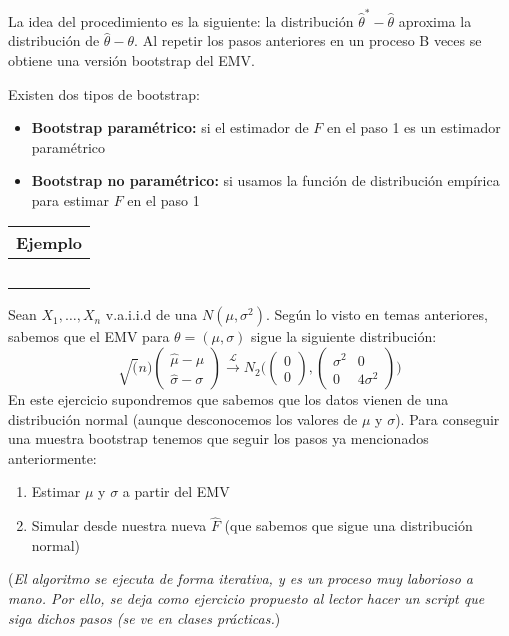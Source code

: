 La idea del procedimiento es la siguiente: la distribución $\hat\theta^*-\hat\theta$ aproxima la distribución de $\hat\theta-\theta$. Al repetir los pasos anteriores en un proceso B veces se obtiene una versión bootstrap del EMV.

Existen dos tipos de bootstrap:
\begin{itemize}
    \item \textbf{Bootstrap paramétrico:} si el estimador de $F$ en el paso 1 es un estimador paramétrico
    \item \textbf{Bootstrap no paramétrico:} si usamos la función de distribución empírica para estimar $F$ en el paso 1
\end{itemize}

\hspace{-1cm}\noindent\begin{tabular}{r}
    \textbf{Ejemplo} \\ \hline \ \\
\end{tabular}

Sean $X_1,\dots,X_n$ v.a.i.i.d de una $N(\mu,\sigma^2)$. Según lo visto en temas anteriores, sabemos que el EMV para $\theta=(\mu,\sigma)$ sigue la siguiente distribución:
$$\sqrt(n)\begin{pmatrix}
        \hat\mu-\mu \\
        \hat\sigma-\sigma
    \end{pmatrix} \overset{\mathcal{L}}{\longrightarrow}N_2\Bigg(\begin{pmatrix}
            0 \\ 0 \end{pmatrix},\begin{pmatrix}
            \sigma^2 & 0 \\ 0 & 4\sigma^2
        \end{pmatrix}\Bigg)$$
En este ejercicio supondremos que sabemos que los datos vienen de una distribución normal (aunque desconocemos los valores de $\mu$ y $\sigma$). Para conseguir una muestra bootstrap tenemos que seguir los pasos ya mencionados anteriormente:
\begin{enumerate}
    \item Estimar $\mu$ y $\sigma$ a partir del EMV
    \item Simular desde nuestra nueva $\hat F$ (que sabemos que sigue una distribución normal)
\end{enumerate}
(\textit{El algoritmo se ejecuta de forma iterativa, y es un proceso muy laborioso a mano. Por ello, se deja como ejercicio propuesto al lector hacer un script que siga dichos pasos (se ve en clases prácticas.})

